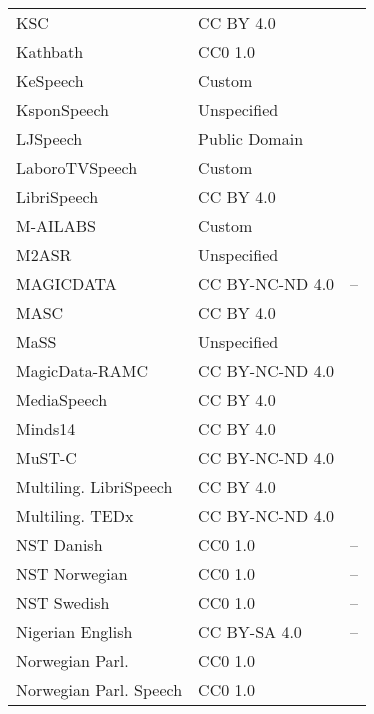 \begin{longtable}{p{5cm}|p{5cm}|p{5cm}}
KSC & CC BY 4.0 & \autocite{khassanovCrowdsourcedOpenSourceKazakh2021} \\
Kathbath & CC0 1.0 & \autocite{javedIndicSUPERBSpeechProcessing2022} \\
KeSpeech & Custom & \autocite{tangKeSpeechOpenSource2021} \\
KsponSpeech & Unspecified & \autocite{bangKsponSpeechKoreanSpontaneous2020} \\
LJSpeech & Public Domain & \autocite{itoLJSpeechDataset2017} \\
LaboroTVSpeech & Custom & \autocite{andoConstructionLargescaleJapanese2021} \\
LibriSpeech & CC BY 4.0 & \autocite{panayotovLibrispeechASRCorpus2015} \\
M-AILABS & Custom & \autocite{solakMAILABSSpeechDataset2024} \\
M2ASR & Unspecified & \autocite{shiFreeKazakhSpeech2017,mamtiminM2ASRKIRGHIZFreeKirghiz2023,zhiM2ASRMONGOFreeMongolian2021,liFreeLinguisticSpeech2017} \\
MAGICDATA & CC BY-NC-ND 4.0 & -- \\
MASC & CC BY 4.0 & \autocite{al-fetyaniMASCMassiveArabic2023} \\
MaSS & Unspecified & \autocite{boitoMaSSLargeClean2020} \\
MagicData-RAMC & CC BY-NC-ND 4.0 & \autocite{yangOpenSourceMagicDataRAMC2022} \\
MediaSpeech & CC BY 4.0 & \autocite{kolobovMediaSpeechMultilanguageASR2021} \\
Minds14 & CC BY 4.0 & \autocite{gerzMultilingualCrossLingualIntent2021} \\
MuST-C & CC BY-NC-ND 4.0 & \autocite{digangiMuSTCMultilingualSpeech2019} \\
Multiling. LibriSpeech & CC BY 4.0 & \autocite{pratapMLSLargeScaleMultilingual2020} \\
Multiling. TEDx & CC BY-NC-ND 4.0 & \autocite{saleskyMultilingualTEDxCorpus2021} \\
NST Danish & CC0 1.0 & -- \\
NST Norwegian & CC0 1.0 & -- \\
NST Swedish & CC0 1.0 & -- \\
Nigerian English & CC BY-SA 4.0 & -- \\
Norwegian Parl. & CC0 1.0 & \autocite{solbergNorwegianParliamentarySpeech2022} \\
Norwegian Parl. Speech & CC0 1.0 & \autocite{solbergNorwegianParliamentarySpeech2022} \\

\end{longtable}
